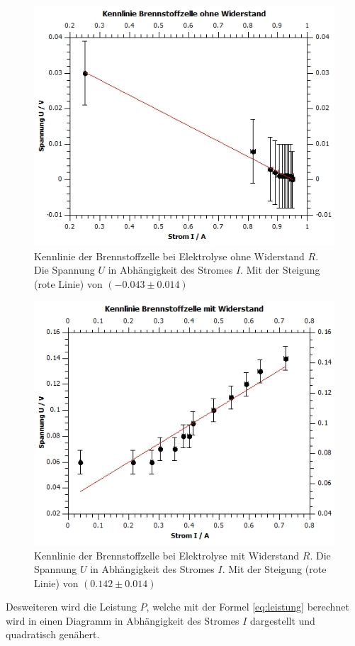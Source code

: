 \documentclass[12pt,a4paper,twoside]{article}
\begin{document}
\begin{figure}[H]
    \centering
    \includegraphics[width=0.6\linewidth]{nudes/brennstoff diagramm ohne r.jpg}
    \caption{Kennlinie der Brennstoffzelle bei Elektrolyse ohne Widerstand $R$. Die Spannung $U$ in Abhängigkeit des Stromes $I$. Mit der Steigung (rote Linie) von $(-0.043 \pm 0.014)$}
    \label{fig:diagramm Brennstoffzelle ohne R}
\end{figure}

\begin{figure}[H]
    \centering
    \includegraphics[width=0.6\linewidth]{nudes/brennstoff diagramm mit r.jpg}
    \caption{Kennlinie der Brennstoffzelle bei Elektrolyse mit Widerstand $R$. Die Spannung $U$ in Abhängigkeit des Stromes $I$. Mit der Steigung (rote Linie) von $(0.142 \pm 0.014)$}
    \label{fig:diagramm Brennstoffzelle mit R}
\end{figure}

\noindent
Desweiteren wird die Leistung $P$, welche mit der Formel \ref{eq:leistung} berechnet wird in einen Diagramm in Abhängigkeit des Stromes $I$ dargestellt und quadratisch genähert. 
\end{document}
